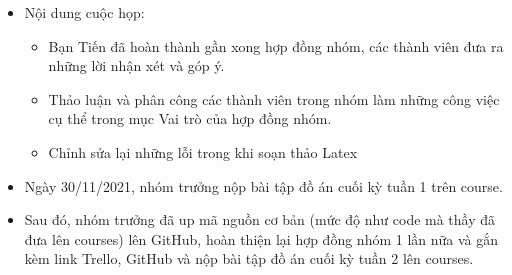 \documentclass[13pt,a4paper]{article}
\begin{document}
\begin{itemize}
    \item Nội dung cuộc họp:
        \begin{itemize}
            \item Bạn Tiến đã hoàn thành gần xong hợp đồng nhóm, các thành viên đưa ra những lời nhận xét và góp ý.
            \item Thảo luận và phân công các thành viên trong nhóm làm những công việc cụ thể trong mục Vai trò của hợp đồng nhóm.
            \item Chỉnh sửa lại những lỗi trong khi soạn thảo Latex
        \end{itemize}
    \item Ngày 30/11/2021, nhóm trưởng nộp bài tập đồ án cuối kỳ tuần 1 trên course.
    \item Sau đó, nhóm trưởng đã up mã nguồn cơ bản (mức độ như code mà thầy đã đưa lên courses) lên GitHub, hoàn thiện lại hợp đồng nhóm 1 lần nữa và gắn kèm link Trello, GitHub và nộp bài tập đồ án cuối kỳ tuần 2 lên courses.
\end{itemize}
\end{document}
